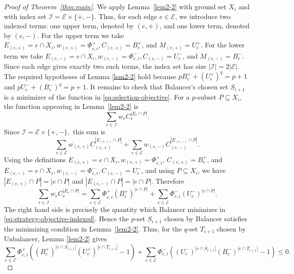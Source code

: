\documentclass[twoside,12pt]{article}
\numberwithin{equation}{section}
\begin{document}
\begin{proof}[Proof of Theorem~\ref{thm:main}]
We apply Lemma~\ref{lem2-2} with ground set $X_i$ and with
index set
$\mathcal I=\mathcal E\times\{+,-\}$.
Thus, for each edge $e\in\mathcal E$, we introduce two indexed terms:
one upper term, denoted by $(e,+)$, and one lower term, denoted by
$(e,-)$.
For the upper term we take
$E_{(e,+)}=e\cap X_i,
        w_{(e,+)}=\Phi_{e,i}^+,
        C_{(e,+)}=B_e^+$,
and
$M_{(e,+)}=U_e^+$.
For the lower term we take
$E_{(e,-)}=e\cap X_i,
        w_{(e,-)}=\Phi_{e,i}^-,
        C_{(e,-)}=U_e^-$,
and
        $M_{(e,-)}=B_e^-$.
Since each edge gives exactly two such terms, the index set has size
$|\mathcal I|=2|\mathcal E|$.
The required hypotheses of Lemma \ref{lem2-2} hold because
$ pB_e^+ +(U_e^+)^q=p+1$
and
 $pU_e^- +(B_e^-)^q=p+1$.
It remains to check that Balancer's chosen set $S_{i+1}$ is a minimizer of the function in \eqref{eq:selection-objective}.  For a $p$-subset $P\subseteq X_i$, the function appearing in Lemma~\ref{lem2-2} is
\[
        \sum_{r\in\mathcal I} w_r C_r^{|E_r\cap P|}.
\]
Since
 $\mathcal I=\mathcal E\times\{+,-\},$
this sum is
\[
        \sum_{e\in\mathcal E}
        w_{(e,+)} C_{(e,+)}^{|E_{(e,+)}\cap P|}
        +
        \sum_{e\in\mathcal E}
        w_{(e,-)} C_{(e,-)}^{|E_{(e,-)}\cap P|}.
\]
Using the definitions
$E_{(e,+)}=e\cap X_i, w_{(e,+)}=\Phi_{e,i}^+$,
        $C_{(e,+)}=B_e^+$,
and
$E_{(e,-)}=e\cap X_i, w_{(e,-)}=\Phi_{e,i}^-,
        C_{(e,-)}=U_e^-$,
and using $P\subseteq X_i$, we have
$|E_{(e,+)}\cap P|=|e\cap P|$
and
$ |E_{(e,-)}\cap P|=|e\cap P|$.
Therefore
\[
        \sum_{r\in\mathcal I} w_r C_r^{|E_r\cap P|}
        =
        \sum_{e\in\mathcal E}
        \Phi_{e,i}^+(B_e^+)^{|e\cap P|}
        +
        \sum_{e\in\mathcal E}
        \Phi_{e,i}^-(U_e^-)^{|e\cap P|}.
\]
The right hand side is precisely the quantity which Balancer minimizes in
\eqref{eq:strategy-objective-indexed}.  Hence the $p$-set $S_{i+1}$ chosen by Balancer satisfies the minimizing condition in Lemma~\ref{lem2-2}.
Thus, for the $q$-set $T_{i+1}$ chosen by Unbalancer, Lemma \ref{lem2-2} gives
$$
    \sum_{e\in\mathcal E}
        \Phi_{e,i}^+
        \left((B_e^+)^{|e\cap S_{i+1}|}
        (U_e^+)^{|e\cap T_{i+1}|}-1\right)+
        \sum_{e\in\mathcal E}
        \Phi_{e,i}^-
        \left((U_e^-)^{|e\cap S_{i+1}|}
        (B_e^-)^{|e\cap T_{i+1}|}-1\right)
        \le0.
$$


\end{proof}
\end{document}
